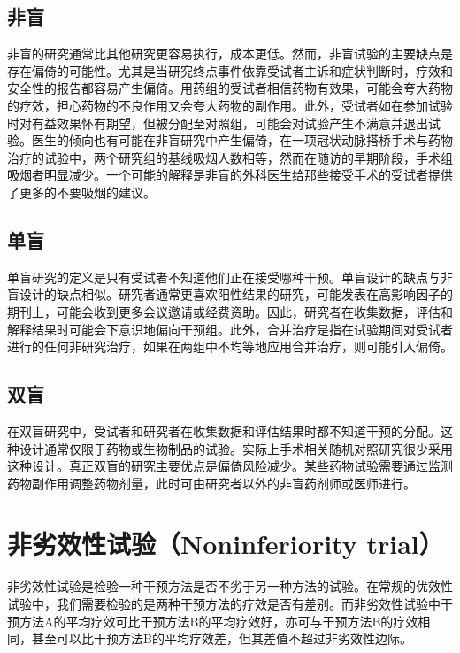 \documentclass[
  chinese-hans,
  letterpaper,
  DIV=11,
  numbers=noendperiod]{scrreprt}
\begin{document}
\subsection{非盲}\label{ux975eux76f2}

非盲的研究通常比其他研究更容易执行，成本更低。然而，非盲试验的主要缺点是存在偏倚的可能性。尤其是当研究终点事件依靠受试者主诉和症状判断时，疗效和安全性的报告都容易产生偏倚。用药组的受试者相信药物有效果，可能会夸大药物的疗效，担心药物的不良作用又会夸大药物的副作用。此外，受试者如在参加试验时对有益效果怀有期望，但被分配至对照组，可能会对试验产生不满意并退出试验。医生的倾向也有可能在非盲研究中产生偏倚，在一项冠状动脉搭桥手术与药物治疗的试验中，两个研究组的基线吸烟人数相等，然而在随访的早期阶段，手术组吸烟者明显减少。一个可能的解释是非盲的外科医生给那些接受手术的受试者提供了更多的不要吸烟的建议。

\subsection{单盲}\label{ux5355ux76f2}

单盲研究的定义是只有受试者不知道他们正在接受哪种干预。单盲设计的缺点与非盲设计的缺点相似。研究者通常更喜欢阳性结果的研究，可能发表在高影响因子的期刊上，可能会收到更多会议邀请或经费资助。因此，研究者在收集数据，评估和解释结果时可能会下意识地偏向干预组。此外，合并治疗是指在试验期间对受试者进行的任何非研究治疗，如果在两组中不均等地应用合并治疗，则可能引入偏倚。

\subsection{双盲}\label{ux53ccux76f2}

在双盲研究中，受试者和研究者在收集数据和评估结果时都不知道干预的分配。这种设计通常仅限于药物或生物制品的试验。实际上手术相关随机对照研究很少采用这种设计。真正双盲的研究主要优点是偏倚风险减少。某些药物试验需要通过监测药物副作用调整药物剂量，此时可由研究者以外的非盲药剂师或医师进行。

\section{非劣效性试验（Noninferiority
trial）}\label{ux975eux52a3ux6548ux6027ux8bd5ux9a8cnoninferiority-trial}

非劣效性试验是检验一种干预方法是否不劣于另一种方法的试验。在常规的优效性试验中，我们需要检验的是两种干预方法的疗效是否有差别。而非劣效性试验中干预方法A的平均疗效可比干预方法B的平均疗效好，亦可与干预方法B的疗效相同，甚至可以比干预方法B的平均疗效差，但其差值不超过非劣效性边际。
\end{document}
